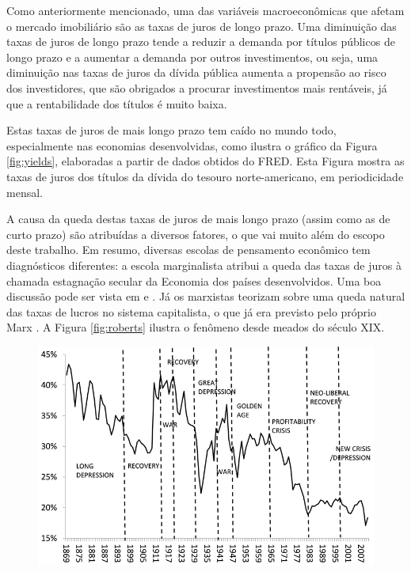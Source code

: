 \documentclass[
	12pt,				%
	oneside,			%
	a4paper,			%
	chapter=TITLE,		%
	section=TITLE,		%
	english,			%
	brazil				%
	]{abntex2}
\begin{document}
\begin{refsection}
Como anteriormente mencionado, uma das variáveis macroeconômicas que afetam o
mercado imobiliário são as taxas de juros de longo prazo. Uma diminuição das
taxas de juros de longo prazo tende a reduzir a demanda por títulos públicos de
longo prazo e a aumentar a demanda por outros investimentos, ou seja, uma
diminuição nas taxas de juros da dívida pública aumenta a propensão ao risco dos
investidores, que são obrigados a procurar investimentos mais rentáveis, já que
a rentabilidade dos títulos é muito baixa.

Estas taxas de juros de mais longo prazo tem caído no mundo todo, especialmente
nas economias desenvolvidas, como ilustra o gráfico da Figura \ref{fig:yields},
elaboradas a partir de dados obtidos do \gls{FRED}. Esta Figura mostra as taxas
de juros dos títulos da dívida do tesouro norte-americano, em periodicidade
mensal.

A causa da queda destas taxas de juros de mais longo prazo (assim como as de
curto prazo) são atribuídas a diversos fatores, o que vai muito além do escopo
deste trabalho. Em resumo, diversas escolas de pensamento econômico tem
diagnósticos diferentes: a escola marginalista atribui a queda das taxas de
juros à chamada estagnação secular da Economia dos países desenvolvidos. Uma boa
discussão pode ser vista em \textcite{bresser2018} e \textcite{krugman2020}. Já os marxistas
teorizam sobre uma queda natural das taxas de lucros no sistema capitalista,
o que já era previsto pelo próprio Marx \autocite{roberts2020}. A Figura \ref{fig:roberts}
ilustra o fenômeno desde meados do século XIX.
\begin{figure}[H]

{\centering \includegraphics[width=1\linewidth]{images/wrp-2} 

}
\end{figure}
\end{refsection}
\end{document}
